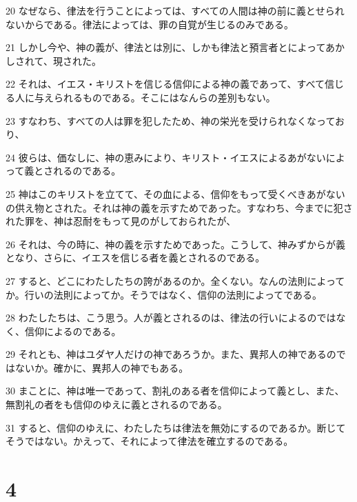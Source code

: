 \par 20 なぜなら、律法を行うことによっては、すべての人間は神の前に義とせられないからである。律法によっては、罪の自覚が生じるのみである。
\par 21 しかし今や、神の義が、律法とは別に、しかも律法と預言者とによってあかしされて、現された。
\par 22 それは、イエス・キリストを信じる信仰による神の義であって、すべて信じる人に与えられるものである。そこにはなんらの差別もない。
\par 23 すなわち、すべての人は罪を犯したため、神の栄光を受けられなくなっており、
\par 24 彼らは、価なしに、神の恵みにより、キリスト・イエスによるあがないによって義とされるのである。
\par 25 神はこのキリストを立てて、その血による、信仰をもって受くべきあがないの供え物とされた。それは神の義を示すためであった。すなわち、今までに犯された罪を、神は忍耐をもって見のがしておられたが、
\par 26 それは、今の時に、神の義を示すためであった。こうして、神みずからが義となり、さらに、イエスを信じる者を義とされるのである。
\par 27 すると、どこにわたしたちの誇があるのか。全くない。なんの法則によってか。行いの法則によってか。そうではなく、信仰の法則によってである。
\par 28 わたしたちは、こう思う。人が義とされるのは、律法の行いによるのではなく、信仰によるのである。
\par 29 それとも、神はユダヤ人だけの神であろうか。また、異邦人の神であるのではないか。確かに、異邦人の神でもある。
\par 30 まことに、神は唯一であって、割礼のある者を信仰によって義とし、また、無割礼の者をも信仰のゆえに義とされるのである。
\par 31 すると、信仰のゆえに、わたしたちは律法を無効にするのであるか。断じてそうではない。かえって、それによって律法を確立するのである。

\chapter{4}


